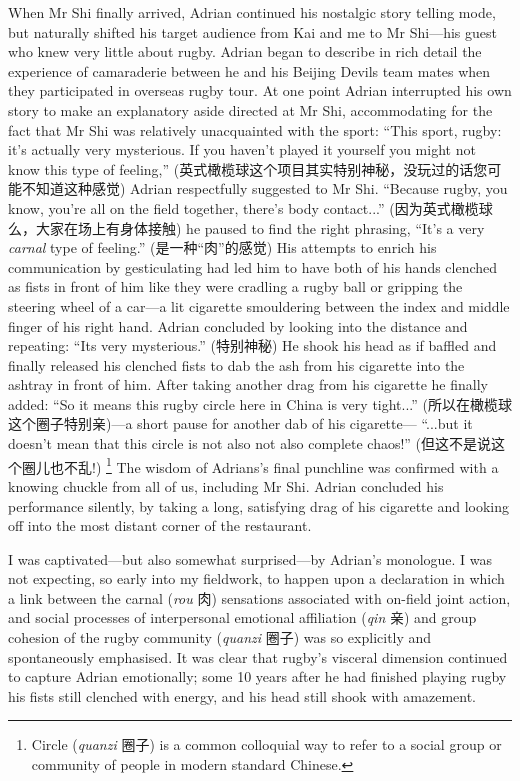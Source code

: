 \begin{CJK}{UTF8}{gbsn}
When Mr Shi finally arrived, Adrian continued his nostalgic story telling mode, but naturally shifted his target audience from Kai and me to Mr Shi---his guest who knew very little about rugby.  Adrian began to describe in rich detail the experience of camaraderie between he and his Beijing Devils team mates when they participated in overseas rugby tour.  At one point Adrian interrupted his own story to make an explanatory aside directed at Mr Shi, accommodating for the fact that Mr Shi was relatively unacquainted with the sport: ``This sport, rugby: it's actually very mysterious. If you haven't played it yourself you might not know this type of feeling,'' (英式橄榄球这个项目其实特别神秘，没玩过的话您可能不知道这种感觉) Adrian respectfully suggested to Mr Shi.  ``Because rugby, you know, you're all on the field together, there's body contact...'' (因为英式橄榄球么，大家在场上有身体接触) he paused to find the right phrasing,  ``It's a very \textit{carnal} type of feeling.'' (是一种``肉''的感觉) His attempts to enrich his communication by gesticulating had led him to have both of his hands clenched as fists in front of him like they were cradling a rugby ball or gripping the steering wheel of a car---a lit cigarette smouldering between the index and middle finger of his right hand.  Adrian concluded by looking into the distance and repeating: ``Its very mysterious.'' (特别神秘) He shook his head as if baffled and finally released his clenched fists to dab the ash from his cigarette into the ashtray in front of him.  After taking another drag from his cigarette he finally added: ``So it means this rugby circle here in China is very tight...'' (所以在橄榄球这个圈子特别亲)---a short pause for another dab of his cigarette--- ``...but it doesn't mean that this circle is not also not also complete chaos!'' (但这不是说这个圈儿也不乱!)
  \footnote{Circle (\textit{quanzi} 圈子) is a common colloquial way to refer to a social group or community of people in modern standard Chinese.}
The wisdom of Adrians's final punchline was confirmed with a knowing chuckle from all of us, including Mr Shi. Adrian concluded his performance silently, by taking a long, satisfying drag of his cigarette and looking off into the most distant corner of the restaurant.

I was captivated---but also somewhat surprised---by Adrian's monologue.  I was not expecting, so early into my fieldwork, to happen upon a declaration in which a link between the carnal (\textit{rou} 肉) sensations associated with on-field joint action, and social processes of interpersonal emotional affiliation (\textit{qin} 亲) and group cohesion of the rugby community (\textit{quanzi} 圈子) was so explicitly and spontaneously emphasised.  It was clear that rugby's visceral dimension continued to capture Adrian emotionally; some 10 years after he had finished playing rugby his fists still clenched with energy, and his head still shook with amazement.


\end{CJK}
